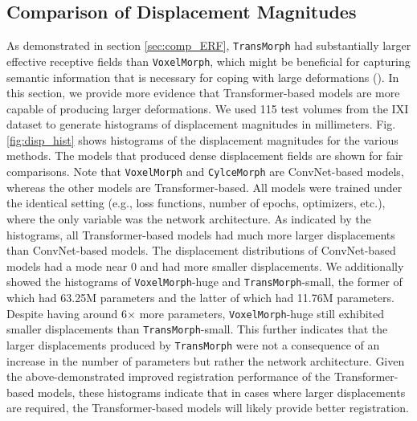 \documentclass[times,twocolumn,final]{elsarticle}
\begin{document}
\subsection{Comparison of Displacement Magnitudes}
As demonstrated in section \ref{sec:comp_ERF}, \texttt{TransMorph} had substantially larger effective receptive fields than \texttt{VoxelMorph}, which might be beneficial for capturing semantic information that is necessary for coping with large deformations (\cite{ha2020semantically}). In this section, we provide more evidence that Transformer-based models are more capable of producing larger deformations. We used 115 test volumes from the IXI dataset to generate histograms of displacement magnitudes in millimeters. Fig. \ref{fig:disp_hist} shows histograms of the displacement magnitudes for the various methods. The models that produced dense displacement fields are shown for fair comparisons.  Note that \texttt{VoxelMorph} and \texttt{CylceMorph} are ConvNet-based models, whereas the other models are Transformer-based. All models were trained under the identical setting (e.g., loss functions, number of epochs, optimizers, etc.), where the only variable was the network architecture. As indicated by the histograms, all Transformer-based models had much more larger displacements than ConvNet-based models. The displacement distributions of ConvNet-based models had a mode near 0 and had more smaller displacements. We additionally showed the histograms of \texttt{VoxelMorph}-huge and \texttt{TransMorph}-small, the former of which had 63.25M parameters and the latter of which had 11.76M parameters. Despite having around 6$\times$ more parameters, \texttt{VoxelMorph}-huge still exhibited smaller displacements than \texttt{TransMorph}-small. This further indicates that the larger displacements produced by \texttt{TransMorph} were not a consequence of an increase in the number of parameters but rather the network architecture. Given the above-demonstrated improved registration performance of the Transformer-based models, these histograms indicate that in cases where larger displacements are required, the Transformer-based models will likely provide better registration.
\end{document}
